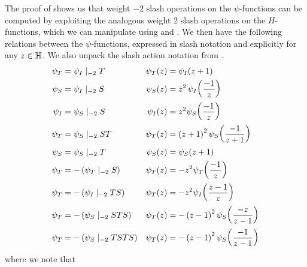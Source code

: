 The proof of  shows us that weight $-2$ slash operations on the $\psi$-functions can be computed by exploiting the analogous weight $2$ slash operations on the $H$-functions, which we can manipulate using  and . We then have the following relations between the $\psi$-functions, expressed in slash notation and explicitly for any $z \in \mathbb{H}$. We also unpack the slash action notation from .
\begin{align}
    \psi_T &= \psi_I \mid_{-2} T &
    \psi_T(z) &= \psi_I\of{z + 1}
    \label{Ch4:Eq:psi_T_eq_psi_I_add_one}
    \\
    \psi_S &= \psi_I \mid_{-2} S &
    \psi_S(z) &= z^2 \, \psi_I\of{\frac{-1}{z}}
    \label{Ch4:Eq:psi_S_eq_zsq_mul_psi_I_neg_inv}
    \\
    \psi_I &= \psi_S \mid_{-2} S &
    \psi_I(z) &= z^2 \psi_S\of{\frac{-1}{z}}
    \label{Ch4:Eq:psi_I_to_psi_S}
    \\
    \psi_T &= \psi_S \mid_{-2} ST &
    \psi_T(z) &= \parenth{z+1}^2 \psi_S\of{\frac{-1}{z+1}}
    \label{Ch4:Eq:psi_T_to_psi_S_add}
    \\
    \psi_{S} &= \psi_S \mid_{-2} T &
    \psi_S(z) &= \psi_S(z + 1)
    \label{Ch4:Eq:psi_S_one_periodic}
    \\
    \psi_{T} &= - \parenth{\psi_T \mid_{-2} S} &
    \psi_T(z) &= -z^2 \psi_T\of{\frac{-1}{z}} \label{Ch4:Eq:psi_T_eq_zsq_mul_psi_T_neg_inv}
    \\
    \psi_{T} &= - \parenth{\psi_I \mid_{-2} TS} &
    \psi_T(z) &= - z^2 \psi_I\of{\frac{z - 1}{z}}
    \label{Ch4:Eq:psi_T_eq_neg_psi_I_slash_TS}
    \\
    \psi_{T} &= - \parenth{\psi_S \mid_{-2} STS} &
    \psi_T(z) &= - \parenth{z - 1}^2 \psi_S\of{\frac{-z}{z - 1}}
    \label{Ch4:Eq:psi_T_eq_neg_psi_S_slash_STS}
    \\
    \psi_{T} &= - \parenth{\psi_S \mid_{-2} TSTS} &
    \psi_T(z) &= - \parenth{z - 1}^2 \psi_S\of{\frac{-1}{z - 1}}
    \label{Ch4:Eq:psi_T_as_psi_S_for_J3_J4}
\end{align}
where we note that
